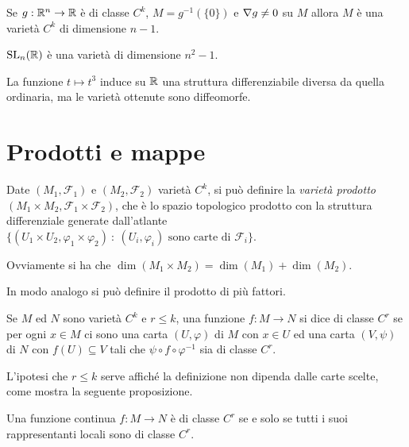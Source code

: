 \begin{exercise}
	Se $g:\mathbb R^n\to\mathbb R$ è di classe $C^k$, $M=g^{-1}(\{0\})$ e $\nabla g\ne 0$ su $M$ allora $M$ è una varietà $C^k$ di dimensione $n-1$.
\end{exercise}
\begin{exercise}
	$\mathrm{SL}_n(\mathbb R)$ è una varietà di dimensione $n^2-1$.
\end{exercise}
\begin{exercise}
	La funzione $t\mapsto t^3$ induce su $\mathbb R$ una struttura differenziabile diversa da quella ordinaria, ma le varietà ottenute sono diffeomorfe.
\end{exercise}
 
 \section{Prodotti e mappe}
 
\begin{definition} 
	Date $(M_1,\mathcal F_1)$ e $(M_2,\mathcal F_2)$ varietà $C^k$, si può definire la \emph{varietà prodotto} $(M_1\times M_2,\mathcal F_1\times\mathcal F_2)$, che è lo spazio topologico prodotto con la struttura differenziale generate dall'atlante $\{(U_1\times U_2,\varphi_1\times\varphi_2)\ :\ \text{$(U_i,\varphi_i)$ sono carte di $\mathcal F_i$}\}$.
\end{definition}

\begin{remark}
	Ovviamente si ha che $\dim(M_1\times M_2)=\dim(M_1)+\dim(M_2)$.
\end{remark}

In modo analogo si può definire il prodotto di più fattori.
 
 \begin{definition} 
  Se $M$ ed $N$ sono varietà $C^k$ e $r\le k$, una funzione $f:M\to N$ si dice
  di classe $C^r$ se per ogni $x\in M$ ci sono una carta $(U,\varphi)$ di $M$ con
  $x\in U$ ed una carta $(V,\psi)$ di $N$ con $f(U)\subseteq V$ tali che $\psi\circ f\circ\varphi^{-1}$
  sia di classe $C^r$.
 \end{definition}
 
 L'ipotesi che $r\le k$ serve affiché la definizione non dipenda dalle carte scelte, come
 mostra la seguente proposizione.
 
 \begin{proposition}
  Una funzione continua $f:M\to N$ è di classe $C^r$ se e solo se tutti i suoi rappresentanti locali sono di classe $C^r$.
 \end{proposition}
 
